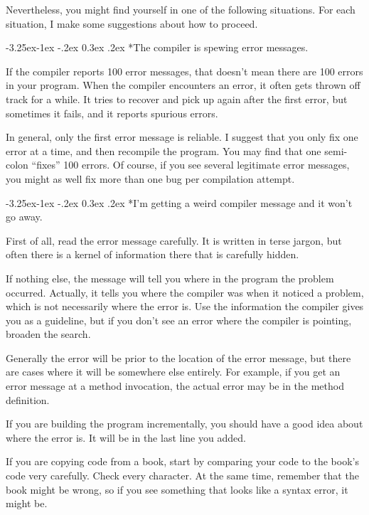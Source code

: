 \documentclass{book}
\makeatletter
\renewcommand\subsection{\@startsection {subsection}{2}{0mm}%
    {-3.25ex\@plus -1ex \@minus -.2ex}%
    {0.3ex \@plus .2ex}%
    {\normalfont\large\bfseries}}
\makeatother
\begin{document}
Nevertheless, you might find yourself in one of the following
situations.  For each situation, I make some suggestions about
how to proceed.


\subsection*{The compiler is spewing error messages.}

If the compiler reports 100 error messages, that doesn't mean
there are 100 errors in your program.  When the compiler encounters
an error, it often gets thrown off track for a while.  It tries to
recover and pick up again after the first error, but sometimes
it fails, and it reports spurious errors.

In general, only the first error message is reliable.  I suggest
that you only fix one error at a time, and then recompile the
program.  You may find that one semi-colon ``fixes'' 100 errors.
Of course, if you see several legitimate error messages, you
might as well fix more than one bug per compilation attempt.


\subsection*{I'm getting a weird compiler message and it
won't go away.}

First of all, read the error message carefully.  It is written
in terse jargon, but often there is a kernel of information
there that is carefully hidden.

If nothing else, the message will tell you where in the program the
problem occurred.  Actually, it tells you where the compiler was
when it noticed a problem, which is not necessarily where the error
is.  Use the information the compiler gives you as a guideline,
but if you don't see an error where the compiler is pointing,
broaden the search.

Generally the error will be prior to the location of the error
message, but there are cases where it will be somewhere else
entirely.  For example, if you get an error message at a method
invocation, the actual error may be in the method definition.

If you are building the program incrementally, you should have
a good idea about where the error is.  It will be in the last
line you added.

If you are copying code from a book, start by comparing 
your code to the book's code very carefully.  Check every character.
At the same time, remember that the book might be wrong, so
if you see something that looks like a syntax error, it might be.
\end{document}
